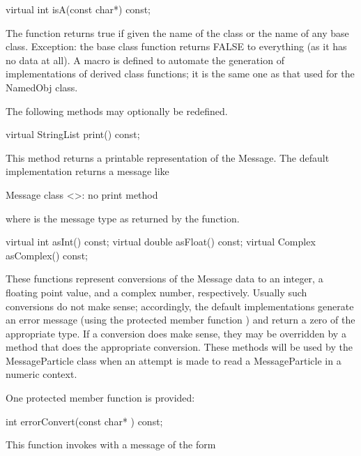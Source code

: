 \begin{example}
virtual int isA(const char*) const;
\end{example}

The  function returns true if given the name of the class
or the name of any base class.  Exception: the base class function returns
FALSE to everything (as it has no data at all).  A macro 
is defined to automate the generation of implementations of derived
class  functions; it is the same one as that used for the
NamedObj class.

The following methods may optionally be redefined.

\begin{example}
virtual StringList print() const;
\end{example}

This method returns a printable representation of the Message.
The default implementation returns a message like

\begin{example}
Message class <>: no print method
\end{example}

where  is the message type as returned by the 
function.

\begin{example}
virtual int asInt() const;
virtual double asFloat() const;
virtual Complex asComplex() const;
\end{example}

These functions represent conversions of the Message data to an integer,
a floating point value, and a complex number, respectively.  Usually
such conversions do not make sense; accordingly, the default
implementations generate an error message (using the protected member
function ) and return a zero of the appropriate type.
If a conversion does make sense, they may be overridden by a method that
does the appropriate conversion.  These methods will be used by the
MessageParticle class when an attempt is made to read a MessageParticle
in a numeric context.

One protected member function is provided:

\begin{example}
int errorConvert(const char* ) const;
\end{example}

This function invokes  with a message of the
form

